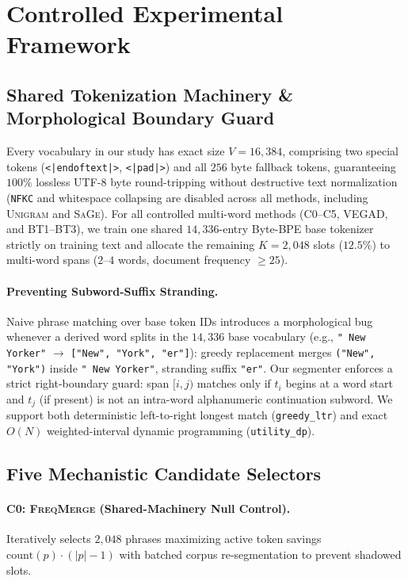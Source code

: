 \documentclass[11pt,a4paper]{article}
\begin{document}
\section{Controlled Experimental Framework}
\label{sec:framework}

\subsection{Shared Tokenization Machinery \& Morphological Boundary Guard}
Every vocabulary in our study has exact size $V=16{,}384$, comprising two special tokens (\texttt{<|endoftext|>}, \texttt{<|pad|>}) and all $256$ byte fallback tokens, guaranteeing $100\%$ lossless UTF-8 byte round-tripping without destructive text normalization (\texttt{NFKC} and whitespace collapsing are disabled across all methods, including \textsc{Unigram} and \textsc{SaGe}). For all controlled multi-word methods (\textsc{C0}--\textsc{C5}, \textsc{VEGAD}, and \textsc{BT1}--\textsc{BT3}), we train one shared $14{,}336$-entry Byte-BPE base tokenizer strictly on training text and allocate the remaining $K=2{,}048$ slots ($12.5\%$) to multi-word spans ($2$--$4$ words, document frequency $\ge 25$).

\paragraph{Preventing Subword-Suffix Stranding.}
Naive phrase matching over base token IDs introduces a morphological bug whenever a derived word splits in the $14{,}336$ base vocabulary (e.g., \texttt{" New Yorker"} $\to$ \texttt{["\textvisiblespace New", "\textvisiblespace York", "er"]}): greedy replacement merges \texttt{("\textvisiblespace New", "\textvisiblespace York")} inside \texttt{" New Yorker"}, stranding suffix \texttt{"er"}. Our segmenter enforces a strict right-boundary guard: span $[i, j)$ matches only if $t_i$ begins at a word start and $t_j$ (if present) is not an intra-word alphanumeric continuation subword. We support both deterministic left-to-right longest match (\texttt{greedy\_ltr}) and exact $O(N)$ weighted-interval dynamic programming (\texttt{utility\_dp}).

\subsection{Five Mechanistic Candidate Selectors}
\paragraph{C0: \textsc{FreqMerge} (Shared-Machinery Null Control).} Iteratively selects $2{,}048$ phrases maximizing active token savings $\text{count}(p)\cdot(|p|-1)$ with batched corpus re-segmentation to prevent shadowed slots.
\end{document}

